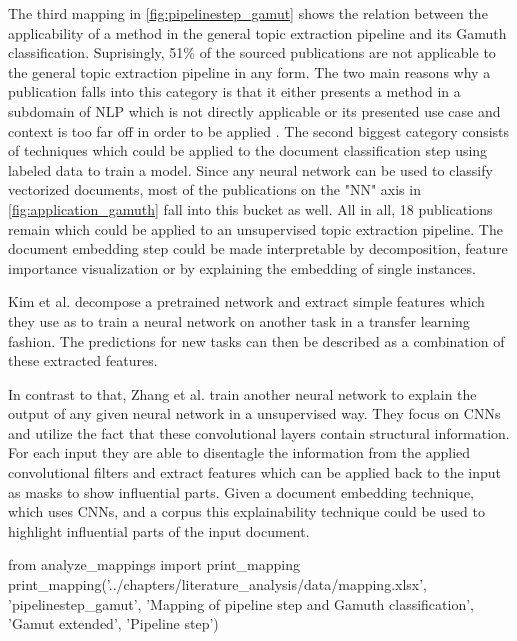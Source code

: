 The third mapping in \autoref{fig:pipelinestep_gamut} shows the relation between the applicability of a method in the general topic extraction pipeline and its Gamuth classification. Suprisingly, 51\% of the sourced publications are not applicable to the general topic extraction pipeline in any form. The two main reasons why a publication falls into this category is that it either presents a method in a subdomain of NLP which is not directly applicable \cite{goyalTransparentAISystems2016} \cite{itoTextVisualizingNeuralNetwork2018a} or its presented use case and context is too far off in order to be applied \cite{8591457} \cite{gengHumancentricTransferLearning}. 
The second biggest category consists of techniques which could be applied to the document classification step using labeled data to train a model. Since any neural network can be used to classify vectorized documents, most of the publications on the "NN" axis in \autoref{fig:application_gamuth} fall into this bucket as well. All in all, 18 publications remain which could be applied to an unsupervised topic extraction pipeline. 
The document embedding step could be made interpretable by decomposition, feature importance visualization or by explaining the embedding of single instances. 

Kim et al. \cite{kimStructureDeepNeural2019} decompose a pretrained network and extract simple features which they use as to train a neural network on another task in a transfer learning fashion. The predictions for new tasks can then be described as a combination of these extracted features.

In contrast to that, Zhang et al. \cite{zhangUnsupervisedLearningNeural2018} train another neural network to explain the output of any given neural network in a unsupervised way. They focus on CNNs and utilize the fact that these convolutional layers contain structural information. For each input they are able to disentagle the information from the applied convolutional filters and extract features which can be applied back to the input as masks to show influential parts. Given a document embedding technique, which uses CNNs, and a corpus this explainability technique could be used to highlight influential parts of the input document.

\begin{pycode}
from analyze_mappings import print_mapping
print_mapping('../chapters/literature_analysis/data/mapping.xlsx', 'pipelinestep_gamut', 'Mapping of pipeline step and Gamuth classification', 'Gamut extended', 'Pipeline step')
\end{pycode}


